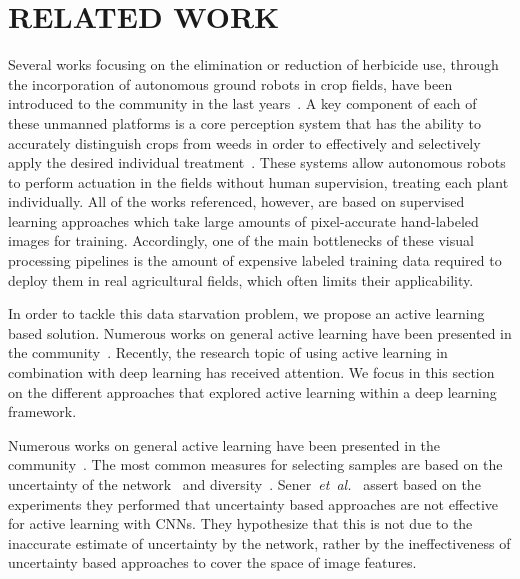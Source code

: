 \documentclass[letterpaper, 10 pt, conference]{ieeeconf}  %
\newcommand\etal{\emph{et~al.}}
\begin{document}
\section{RELATED WORK}
\label{sec:related}



Several works focusing on the elimination or reduction of herbicide use,
through the incorporation of autonomous ground robots in crop fields, have
been introduced to the community in the last years~\cite{ducket2018arxiv, liebisch2016wslw, mccool2018ral}.
A key component of each of these unmanned platforms is a core perception system that
has the ability to accurately distinguish crops from weeds in order to effectively
and selectively apply the desired individual treatment~\cite{ lottes2018iros, mccool2017ral,milioto2017uavg,milioto2018real, sa2018rs}.
These systems allow autonomous robots to perform actuation in the fields without human supervision, treating each plant individually.
All of the works referenced, however, are based on supervised learning approaches which take large amounts of pixel-accurate hand-labeled images for training. 
Accordingly, one of the main bottlenecks of these visual processing pipelines is the amount of expensive labeled training data required to deploy them in real agricultural fields, which often limits their applicability.

In order to tackle this data starvation problem, we propose an active learning based solution. Numerous works on general active learning have been presented in the community~\cite{settles2009active,guyon2011results,holub2008entropy}. Recently, the research topic of using active learning in combination with deep learning has received attention. We focus in this section on the different approaches that explored active learning within a deep learning framework.

Numerous works on general active learning have been presented in the community~\cite{settles2009active,guyon2011results,holub2008entropy}. The most common measures for selecting samples are based on the uncertainty of the network~\cite{zhou2017fine, yang2017suggestive, gal2017deep, wang2017cost} and diversity~\cite{zhou2017fine, dutt2016active, kading2016active}.  Sener~\etal~\cite{sener2017geometric} assert based on the experiments they performed that uncertainty based approaches are not effective for active learning with CNNs. They hypothesize that this is not due to the inaccurate estimate of uncertainty by the network, rather by the ineffectiveness of uncertainty based approaches to cover the space of image features.
\end{document}
